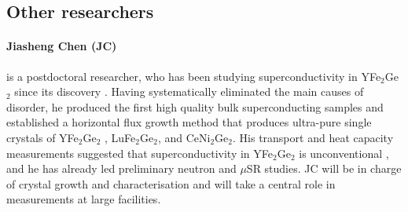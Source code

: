 \subsection*{Other researchers}
\paragraph{Jiasheng Chen (JC)} is a postdoctoral researcher, who 
has been studying superconductivity in YFe$_2$Ge$_2$ since its discovery . Having systematically eliminated the main causes of disorder, he produced the first high quality bulk superconducting samples   and established a horizontal flux growth method that produces ultra-pure single crystals of YFe$_2$Ge$_2$ , LuFe$_2$Ge$_2$, and CeNi$_2$Ge$_2$. His transport and heat capacity measurements suggested that superconductivity in YFe$_2$Ge$_2$ is unconventional , and he has already led preliminary neutron and $\mu$SR studies. 
JC will be in charge of crystal growth and characterisation and will take a central role in measurements at large facilities.



